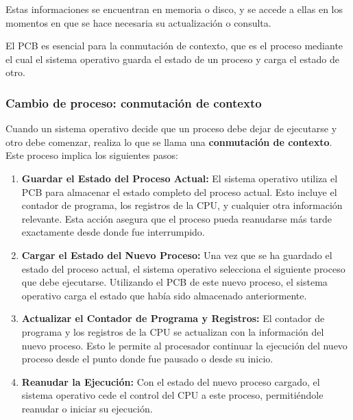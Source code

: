 Estas informaciones se encuentran en memoria o disco, y se accede a ellas en los momentos en que se hace necesaria su actualización o consulta.

El PCB es esencial para la conmutación de contexto, que es el proceso mediante el cual el sistema operativo guarda el estado de un proceso y carga el estado de otro.

\subsubsection{Cambio de proceso: conmutación de contexto}

Cuando un sistema operativo decide que un proceso debe dejar de ejecutarse y otro debe comenzar, realiza lo que se llama una \textbf{conmutación de contexto}. Este proceso implica los siguientes pasos:

\begin{tcolorbox}


\begin{enumerate}
	\item \textbf{Guardar el Estado del Proceso Actual:} El sistema operativo utiliza el PCB para almacenar el estado completo del proceso actual. Esto incluye el contador de programa, los registros de la CPU, y cualquier otra información relevante. Esta acción asegura que el proceso pueda reanudarse más tarde exactamente desde donde fue interrumpido.
	
	\item \textbf{Cargar el Estado del Nuevo Proceso:} Una vez que se ha guardado el estado del proceso actual, el sistema operativo selecciona el siguiente proceso que debe ejecutarse. Utilizando el PCB de este nuevo proceso, el sistema operativo carga el estado que había sido almacenado anteriormente.
	
	\item \textbf{Actualizar el Contador de Programa y Registros:} El contador de programa y los registros de la CPU se actualizan con la información del nuevo proceso. Esto le permite al procesador continuar la ejecución del nuevo proceso desde el punto donde fue pausado o desde su inicio.
	
	\item \textbf{Reanudar la Ejecución:} Con el estado del nuevo proceso cargado, el sistema operativo cede el control del CPU a este proceso, permitiéndole reanudar o iniciar su ejecución.
\end{enumerate}

\end{tcolorbox}

